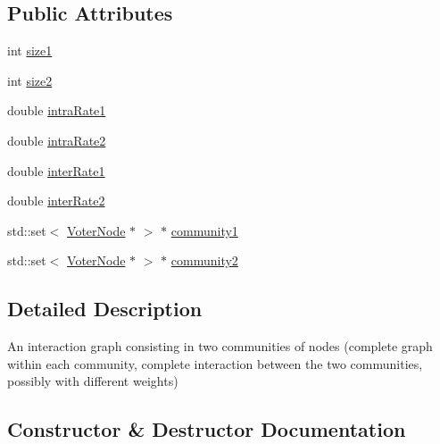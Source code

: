 \subsection*{Public Attributes}
\begin{DoxyCompactItemize}
\item 
int \hyperlink{class_two_communities_voter_graph_a3c9db0ac7e58d875ab3ce277bf74b284}{size1}
\item 
int \hyperlink{class_two_communities_voter_graph_a8b88457f020773b984e0d8c85d9ee502}{size2}
\item 
double \hyperlink{class_two_communities_voter_graph_a96a32ba7529177a7f6b73e827a57791e}{intra\+Rate1}
\item 
double \hyperlink{class_two_communities_voter_graph_a6e7ea06e014d75b7bf18441885e07e1e}{intra\+Rate2}
\item 
double \hyperlink{class_two_communities_voter_graph_af08c3b9a6e6f1dc8659a38ecd2d1afde}{inter\+Rate1}
\item 
double \hyperlink{class_two_communities_voter_graph_afab8bb5994f7fd1370d7d81caf7277d4}{inter\+Rate2}
\item 
std\+::set$<$ \hyperlink{class_voter_node}{Voter\+Node} $\ast$ $>$ $\ast$ \hyperlink{class_two_communities_voter_graph_a354768f44c0a3daa6d0a70a20df77af5}{community1}
\item 
std\+::set$<$ \hyperlink{class_voter_node}{Voter\+Node} $\ast$ $>$ $\ast$ \hyperlink{class_two_communities_voter_graph_a7c918c6733474caa86bc2d217bd2cb4d}{community2}
\end{DoxyCompactItemize}


\subsection{Detailed Description}
An interaction graph consisting in two communities of nodes (complete graph within each community, complete interaction between the two communities, possibly with different weights) 

\subsection{Constructor \& Destructor Documentation}
\hypertarget{class_two_communities_voter_graph_a37456a72e366202f8193a9f1935c69a3}{}
